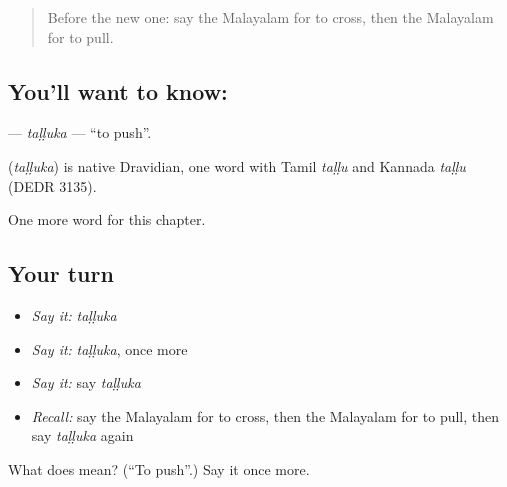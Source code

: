 \begin{quote}
Before the new one: say the Malayalam for to cross, then the Malayalam for to pull.
\end{quote}

\subsection*{You'll want to know: }
\textbf{} — \emph{taḷḷuka} — \textquotedblleft{}to push\textquotedblright{}.

\begin{cousinweb}
\textbf{} (\emph{taḷḷuka}) is native Dravidian, one word with Tamil \emph{taḷḷu} and Kannada \emph{taḷḷu} (DEDR 3135).
\end{cousinweb}

\begin{grammarlens}[title={What you've built}]
One more word for this chapter.
\end{grammarlens}

\subsection*{Your turn}
\begin{itemize}
\raggedright
  \item \emph{Say it:} \emph{taḷḷuka}
  \item \emph{Say it:} \emph{taḷḷuka}, once more
  \item \emph{Say it:} say \emph{taḷḷuka}
  \item \emph{Recall:} say the Malayalam for to cross, then the Malayalam for to pull, then say \emph{taḷḷuka} again
\end{itemize}

\begin{tcolorbox}[breakable,colback=teal!4,colframe=teal!35!black,title={Before you move on}]
What does  mean? (\textquotedblleft{}To push\textquotedblright{}.) Say it once more.
\end{tcolorbox}
